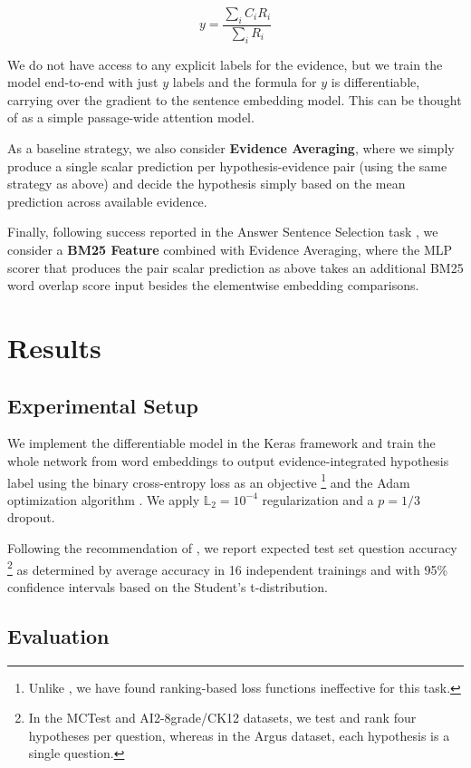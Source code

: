 \documentclass[11pt]{article}
\begin{document}
$$ y  = \frac{\sum_i C_iR_i}{\sum_i R_i} $$

We do not have access to any explicit labels for the evidence,
but we train the model end-to-end with just $y$ labels and the formula
for $y$ is differentiable, carrying over the gradient to the sentence
embedding model.
This can be thought of as a simple passage-wide attention model.

As a baseline strategy, we also consider \textbf{Evidence Averaging}, where
we simply produce a single scalar prediction per hypothesis-evidence pair
(using the same strategy as above) and decide the hypothesis simply based
on the mean prediction across available evidence.

Finally, following success reported in the Answer Sentence Selection task \cite{sps},
we consider a \textbf{BM25 Feature} combined with Evidence Averaging,
where the MLP scorer that produces the pair scalar prediction as above takes
an additional BM25 word overlap score input \cite{BM25} besides the elementwise
embedding comparisons.

\section{Results}
\label{sec:res}

\subsection{Experimental Setup}

We implement the differentiable model in the Keras framework \cite{Keras} and
train the whole network from word embeddings to output evidence-integrated
hypothesis label using the binary cross-entropy loss as an objective%
\footnote{Unlike \cite{HABCNN}, we have found ranking-based loss functions
	ineffective for this task.}
and the Adam optimization algorithm \cite{Adam}.  We apply $\mathbb{L}_2 = 10^{-4}$
regularization and a $p=1/3$ dropout.

Following the recommendation of \cite{sps}, we report expected test set
question accuracy%
\footnote{In the MCTest and AI2-8grade/CK12 datasets, we test and rank four
	hypotheses per question, whereas in the Argus dataset, each
	hypothesis is a single question.}
as determined by average accuracy in 16 independent trainings
and with 95\% confidence intervals based on the Student's
t-distribution.

\subsection{Evaluation}
\end{document}
